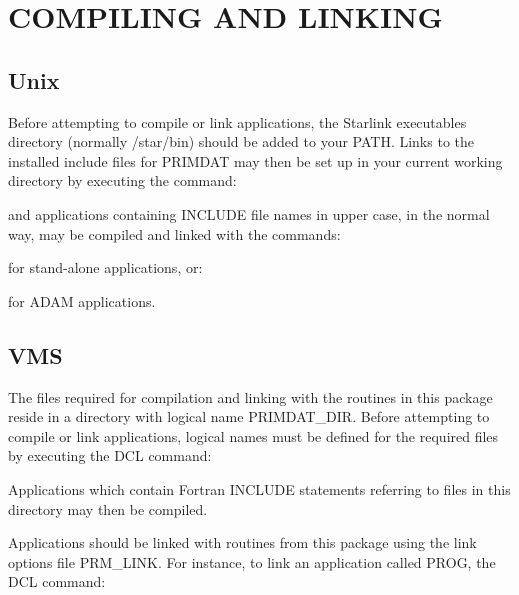 \documentclass[11pt,nolof]{starlink}
\providecommand{\name}[1]{\mbox{#1}}
\begin{document}
\newpage
\section{COMPILING AND LINKING}

\subsection{Unix}
\label{compunix}
Before attempting to compile or link applications, the Starlink
executables directory (normally /star/bin) should be added to your PATH.
Links to the installed include files for PRIMDAT may then be set up
in your current working directory by executing the command:

\begin{terminalv}
\end{terminalv}

and applications containing INCLUDE file names in upper case, in the normal way,
may be compiled and linked with the commands:

\begin{terminalv}
\end{terminalv}

for stand-alone applications, or:

\begin{terminalv}
\end{terminalv}

for ADAM applications.

\subsection{VMS}
The files required for compilation and linking with the routines in this
package reside in a directory with logical name \name{PRIMDAT\_DIR}.
Before attempting to compile or link applications, logical names must be
defined for the required files by executing the \name{DCL} command:


Applications which contain Fortran \name{INCLUDE} statements referring to
files in this directory may then be compiled.

Applications should be linked with routines from this package using the link
options file \name{PRM\_LINK}.
For instance, to link an application called \name{PROG}, the \name{DCL}
command:
\end{document}
